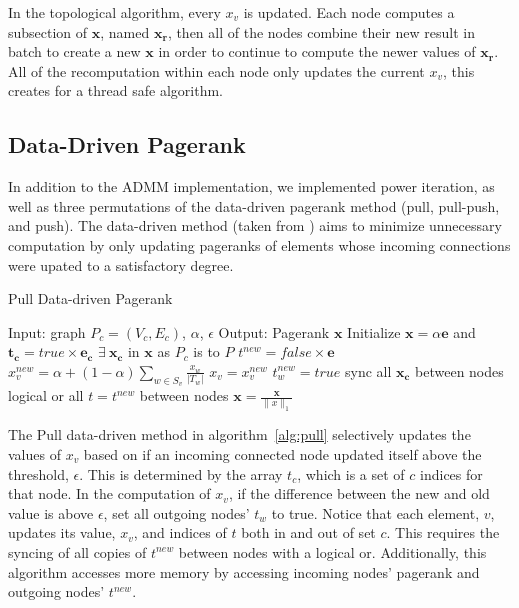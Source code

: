 \documentclass[letterpaper,11pt,onecolumn]{article}
\begin{document}
In the topological algorithm, every $x_v$ is updated. Each node computes a subsection of $\mathbf{x}$, named $\mathbf{x_r}$, then all of the nodes combine their new result in batch to create a new $\mathbf{x}$ in order to continue to compute the newer values of $\mathbf{x_r}$. All of the recomputation within each node only updates the current $x_v$, this creates for a thread safe algorithm.

\subsection{Data-Driven Pagerank}
In addition to the ADMM implementation, we implemented power iteration, as well as three permutations of the data-driven pagerank method (pull, pull-push, and push). The data-driven method (taken from \cite{Joyce}) aims to minimize unnecessary computation by only updating pageranks of elements whose incoming connections were upated to a satisfactory degree. 

\begin{algorithm}
\caption{Pull Data-driven Pagerank}
\label{alg:pull}
\begin{algorithmic}[1]
  \STATE Input: graph $P_{c} = (V_c, E_c)$, $\alpha$, $\epsilon$
  \STATE Output: Pagerank $\mathbf{x}$
  \STATE Initialize $\mathbf{x} = \alpha \mathbf{e}$ and $\mathbf{t_c} = true \times \mathbf{e_c}$
  \STATE $\exists  \medspace \mathbf{x_c}$ in $\mathbf{x}$ as $P_c$ is to $P$
	\STATE $t^{new} = false \times \mathbf{e}$
			\STATE $x_{v}^{new} = \alpha + (1 - \alpha) \sum_{w \in S_v} \frac{x_{w}}{|T_w|} $
				\STATE $x_v = x_v^{new}$
					\STATE $t_w^{new} = true$
				\ENDFOR
			\ENDIF
		\ENDIF
	\ENDFOR
	\STATE sync all $\mathbf{x_c}$ between nodes
	\STATE logical or all $t = t^{new}$ between nodes
  \ENDWHILE
  \STATE $\mathbf{x} = \frac{\mathbf{x} }{\|x\|_{1}}$
\end{algorithmic}
\end{algorithm}


The Pull data-driven method in algorithm~\ref{alg:pull} selectively updates the values of $x_v$ based on if an incoming connected node updated itself above the threshold, $\epsilon$. This is determined by the array $t_c$, which is a set of $c$ indices for that node. In the computation of $x_v$, if the difference between the new and old value is above $\epsilon$, set all outgoing nodes' $t_w$ to true. Notice that each element, $v$, updates its value, $x_v$, and indices of $t$ both in and out of set $c$. This requires the syncing of all copies of $t^{new}$ between nodes with a logical or. Additionally, this algorithm accesses more memory by accessing incoming nodes' pagerank and outgoing nodes' $t^{new}$.
\end{document}
